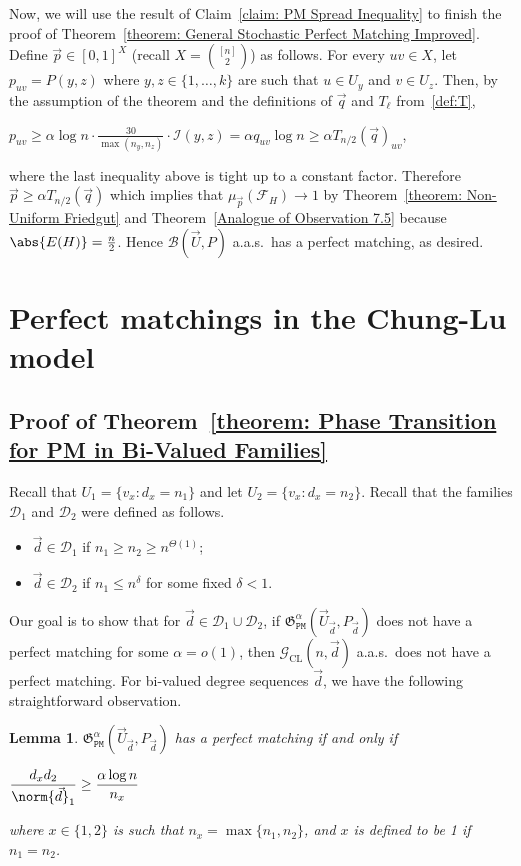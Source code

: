 \documentclass[12pt]{article}
\newtheorem{lemma}[theorem]{Lemma}
\begin{document}
Now, we will use the result of Claim~\ref{claim: PM Spread Inequality} to finish the proof of Theorem~\ref{theorem: General Stochastic Perfect Matching Improved}. 
Define $\vec{p}\in [0,1]^X$ (recall $X = \binom{[n]}{2}$) as follows. For every $uv\in X$, let $p_{uv} = P(y,z)$ where $y,z\in\{1,\ldots,k\}$ are such that $u\in U_y$ and $v\in U_z$. 
Then, by the assumption of the theorem and the definitions of $\vec{q}$ and $T_{\ell}$ from~\ref{def:T},
\begin{center}
    $p_{uv} \geq \alpha\log n\cdot\displaystyle\frac{30}{\max(n_y, n_z)}\cdot\mathcal{I}(y,z) = \alpha q_{uv}\log n \geq \alpha T_{n/2}(\vec{q})_{uv}$,
\end{center}
where the last inequality above is tight up to a constant factor. Therefore $\vec{p}\geq \alpha T_{n/2}(\vec{q})$ which implies that $\mu_{\vec{p}}(\mathcal{F}_H)\rightarrow 1$ by Theorem~\ref{theorem: Non-Uniform Friedgut} and Theorem~\ref{Analogue of Observation 7.5} because $\abs{E(H)} = \frac{n}{2}$. Hence $\mathcal{B}(\vec{U}, P)$ a.a.s.\ has a perfect matching, as desired.\hfill \qedsymbol

\section{Perfect matchings in the Chung-Lu model}
\label{section: Proofs for Chung-Lu}

\subsection{Proof of Theorem~\ref{theorem: Phase Transition for PM in Bi-Valued Families}}
\label{section: Proof for Bi-Valued Chung-Lu}

\noindent Recall that $U_1 = \{v_x: d_x = n_1\}$ and let $U_2 = \{v_x: d_x = n_2\}$. 
Recall that the families $\mathcal{D}_1$ and $\mathcal{D}_2$ were defined as follows.
\begin{itemize}
    \item $\vec{d}\in\mathcal{D}_1$ if $n_1\geq n_2 \ge n^{\Theta(1)}$;
    \item $\vec{d}\in\mathcal{D}_2$ if $n_1\leq n^{\delta}$ for some fixed $\delta < 1$.
\end{itemize}


Our goal is to show that for $\vec{d}\in\mathcal{D}_1\cup\mathcal{D}_2$, if $\mathfrak{G}_{\texttt{PM}}^{\alpha}\left(\vec{U}_{\vec{d}}, P_{\vec{d}}\right)$ does not have a perfect matching for some $\alpha = o(1)$, then $\mathcal{G}_{\text{CL}}(n, \vec{d})$ a.a.s.\ does not have a perfect matching. For bi-valued degree sequences $\vec{d}$, we have the following straightforward observation. 
\begin{lemma}
\label{lemma: bi-valued PM equivalence}
$\mathfrak{G}_{\texttt{PM}}^{\alpha}\left(\vec{U}_{\vec{d}}, P_{\vec{d}}\right)$ has a perfect matching if and only if 
\begin{center}
    $\displaystyle\frac{d_x d_2}{\norm{\vec{d}}_1}\geq \frac{\alpha\log n}{n_x}$
\end{center}
where $x\in\{1,2\}$ is such that $n_x = \max\{n_1, n_2\}$, and $x$ is defined to be 1 if $n_1=n_2$.
\end{lemma} 
\end{document}
